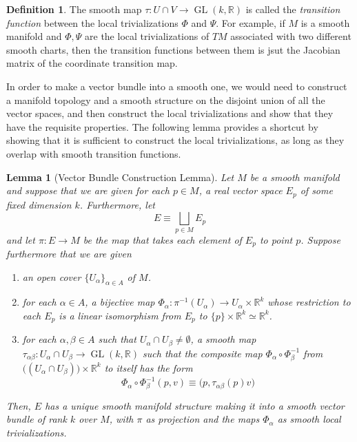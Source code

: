 \documentclass{article}
\DeclareMathOperator{\GL}{GL}
\newtheorem{lemma}[theorem]{Lemma}
\theoremstyle{remark}
\theoremstyle{definition}
\newtheorem{definition}{Definition}[section]
\begin{document}
\begin{definition}
The smooth map $\tau: U \cap V \longrightarrow \GL(k, \mathbb{R})$ is called the \textit{transition function} between the local trivializations $\Phi$ and $\Psi$. For example, if $M$ is a smooth manifold and $\Phi, \Psi$ are the local trivializations of $TM$ associated with two different smooth charts, then the transition functions between them is jsut the Jacobian matrix of the coordinate transition map. 
\end{definition}

In order to make a vector bundle into a smooth one, we would need to construct a manifold topology and a smooth structure on the disjoint union of all the vector spaces, and then construct the local trivializations and show that they have the requisite properties. The following lemma provides a shortcut by showing that it is sufficient to construct the local trivializations, as long as they overlap with smooth transition functions. 

\begin{lemma}[Vector Bundle Construction Lemma]
Let $M$ be a smooth manifold and suppose that we are given for each $p \in M$, a real vector space $E_p$ of some fixed dimension $k$. Furthermore, let 
\[E \equiv \bigsqcup_{p \in M} E_p\]
and let $\pi: E \longrightarrow M$ be the map that takes each element of $E_p$ to point $p$. Suppose furthermore that we are given
\begin{enumerate}
    \item an open cover $\{U_\alpha\}_{\alpha \in A}$ of $M$. 
    \item for each $\alpha \in A$, a bijective map $\Phi_\alpha : \pi^{-1} (U_\alpha) \longrightarrow U_\alpha \times \mathbb{R}^k$ whose restriction to each $E_p$ is a linear isomorphism from $E_p$ to $\{p\} \times \mathbb{R}^k \simeq \mathbb{R}^k$. 
    \item for each $\alpha, \beta \in A$ such that $U_\alpha \cap U_\beta \neq \emptyset$, a smooth map $\tau_{\alpha \beta}: U_\alpha \cap U_\beta \longrightarrow \GL(k, \mathbb{R})$ such that the composite map $\Phi_\alpha \circ \Phi_\beta^{-1}$ from $\big( (U_\alpha \cap U_\beta)\big) \times \mathbb{R}^k$ to itself has the form 
    \[\Phi_\alpha \circ \Phi_\beta^{-1} (p, v) \equiv \big( p, \tau_{\alpha \beta} (p) v \big)\]
\end{enumerate}
Then, $E$ has a unique smooth manifold structure making it into a smooth vector bundle of rank $k$ over $M$, with $\pi$ as projection and the maps $\Phi_\alpha$ as smooth local trivializations. 
\end{lemma}
\end{document}
